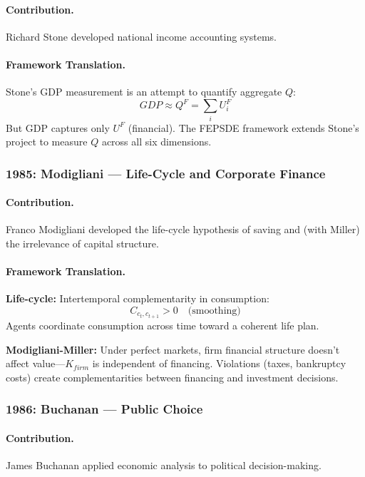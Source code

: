 \documentclass[12pt,a4paper]{article}
\begin{document}
\paragraph{Contribution.}
Richard Stone developed national income accounting systems.

\paragraph{Framework Translation.}
Stone's GDP measurement is an attempt to quantify aggregate $Q$:
\begin{equation}
  GDP \approx Q^F = \sum_i U^F_i
\end{equation}
But GDP captures only $U^F$ (financial). The FEPSDE framework extends
Stone's project to measure $Q$ across all six dimensions.

\subsubsection{1985: Modigliani --- Life-Cycle and Corporate Finance}

\paragraph{Contribution.}
Franco Modigliani developed the life-cycle hypothesis of saving and
(with Miller) the irrelevance of capital structure.

\paragraph{Framework Translation.}
\textbf{Life-cycle:} Intertemporal complementarity in consumption:
\begin{equation}
  C_{c_t, c_{t+1}} > 0 \quad \text{(smoothing)}
\end{equation}
Agents coordinate consumption across time toward a coherent life plan.

\textbf{Modigliani-Miller:} Under perfect markets, firm financial structure
doesn't affect value---$K_{firm}$ is independent of financing.
Violations (taxes, bankruptcy costs) create complementarities between
financing and investment decisions.

\subsubsection{1986: Buchanan --- Public Choice}

\paragraph{Contribution.}
James Buchanan applied economic analysis to political decision-making.
\end{document}
